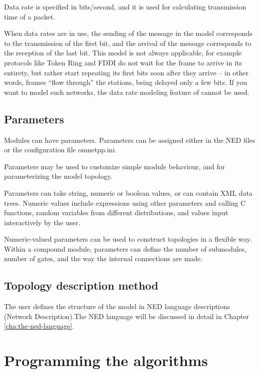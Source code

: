 Data rate is specified in bits/second, and it is used for calculating
transmission time of a packet.

When data rates are in use, the sending of the message in the model
corresponds to the transmission of the first bit, and
the arrival of the message corresponds to the reception
of the last bit. This model is not always applicable,
for example protocols like Token Ring and FDDI do not wait
for the frame to arrive in its entirety, but rather start repeating
its first bits soon after they arrive -- in other words,
frames ``flow through'' the stations, being delayed only a few bits.
If you want to model such networks, the data rate modeling feature
of {\opp} cannot be used.



\subsection{Parameters}

Modules can have parameters. Parameters can be assigned either
in the NED files or the configuration file omnetpp.ini.

Parameters may be used to customize simple module behaviour,
and for parameterizing the model topology.

Parameters can take string, numeric or boolean values, or can
contain XML data trees. Numeric values include expressions using
other parameters and calling C functions, random variables from
different distributions, and values input interactively by the user.

Numeric-valued parameters can be used to construct topologies in a
flexible way. Within a compound module, parameters can define the
number of submodules, number of gates, and the way the internal
connections are made.


\subsection{Topology description method}
The user defines the structure of the model in NED language descriptions
(Network Description).The NED language will be discussed in detail
in Chapter \ref{cha:the-ned-language}.


\section{Programming the algorithms}

